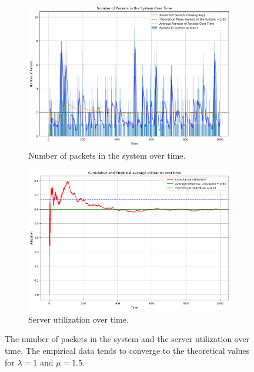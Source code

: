 \documentclass[a4paper]{article}
\begin{document}
\begin{figure}[htbp]
  \centering
  \begin{subfigure}[t]{0.4\textwidth}
    \centering
    \includegraphics[width=\textwidth]{images/ex1_p1_pis_ot.png}
    \caption{
      Number of packets in the system over time.
    }\label{fig:e1p1-pis}
  \end{subfigure}
  \hfill
  \begin{subfigure}[t]{0.4\textwidth}
    \centering
    \includegraphics[width=\textwidth]{images/ex1_p1_util_ot.png}
    \caption{
      Server utilization over time.
    }\label{fig:e1p1-util}
  \end{subfigure}
  \caption{
    The number of packets in the system and the server utilization over time.
    The empirical data tends to converge to the theoretical values for $\lambda = 1$ and $\mu = 1.5$.
  }\label{fig:e1p1}
\end{figure}
\end{document}
